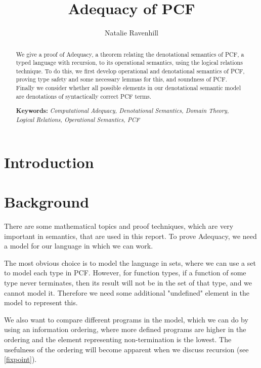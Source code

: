 \documentclass{bhamthesis}
\title{Adequacy of PCF}
\author{Natalie Ravenhill}
\begin{document}
\maketitle
\newcommand{\natb}{\mathbb{N}_{\bot}}
\begin{abstract}
We give a proof of Adequacy, a theorem relating the denotational semantics of PCF, a typed language with recursion,  to its operational semantics, using the logical relations technique. To do this, we first develop operational and denotational semantics of PCF, proving type safety and some necessary lemmas for this, and soundness of PCF. Finally we consider whether all possible elements in our denotational semantic model are denotations of syntactically correct PCF terms.
\vspace{0.5cm}

\textbf{Keywords:} \emph{Computational Adequacy, Denotational Semantics, Domain Theory,  Logical Relations, Operational Semantics, PCF}
\end{abstract}

\begin{acknowledgements}
\end{acknowledgements}

\tableofcontents
\chapter{Introduction}\label{ch1}


\chapter{Background}\label{ch2}
There are some mathematical topics and proof techniques, which are very important in semantics, that are used in this report. To prove Adequacy, we need a model for our language in which we can work.

The most obvious choice is to model the language in sets, where we can use a set to model each type in PCF. However, for function types, if a function of some type never terminates, then its result will not be in the set of that type, and we cannot model it. Therefore we need some additional "undefined" element in the model to represent this.

We also want to compare different programs in the model, which we can do by using an information ordering, where more defined programs are higher in the ordering and the element representing non-termination is the lowest. The usefulness of the ordering will become apparent when we discuss recursion (see \ref{fixpoint}).
\end{document}
